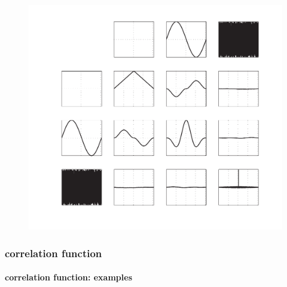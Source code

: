 \begin{frame}
	{
		\vspace{-5mm}
		\begin{figure}
			\centering
				\includegraphics[scale=.5]{graph/xcorr}
			\label{fig:xcorr}
		\end{figure}
	}
\end{frame}

\begin{frame}\frametitle{correlation function}\framesubtitle{correlation function: examples}
\end{frame}	

